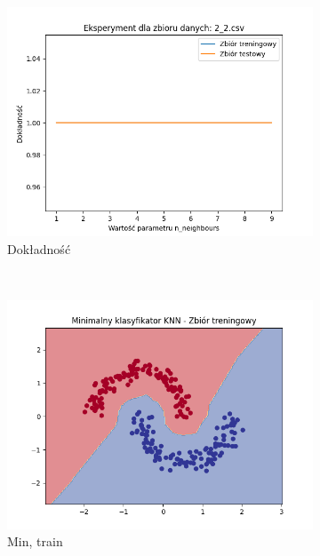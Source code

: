 \documentclass[12pt]{article}
\newcommand*{\subfigwidth}{0.24\textwidth}
\begin{document}
\renewcommand*{\subfigwidth}{0.16\textwidth}
\begin{figure}[H]\centering
    \begin{subfigure}[t]{\subfigwidth}
        \includegraphics[width=\linewidth]{img/exp_2/knn/2_2/accuracy.png}
        \caption{Dokładność}
    \end{subfigure}
    \\
    \begin{subfigure}[t]{\subfigwidth}
        \includegraphics[width=\linewidth]{img/exp_2/knn/2_2/min/train_boundary.png}
        \caption{Min, train}
    \end{subfigure}
    \hfill
    \begin{subfigure}[t]{\subfigwidth}

\end{subfigure}
\end{figure}
\end{document}
